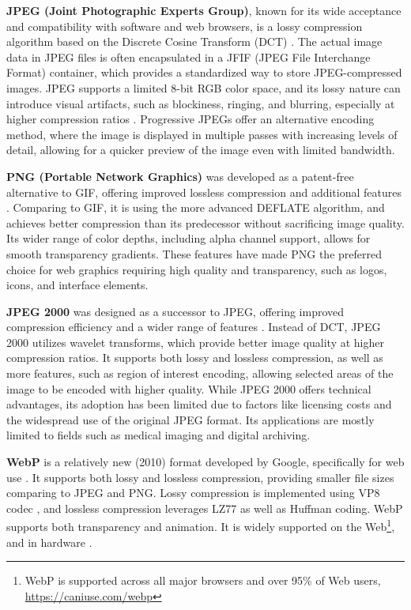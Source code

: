 \textbf{JPEG (Joint Photographic Experts Group)}, known for its wide acceptance and compatibility with software and web browsers, is a lossy compression algorithm based on the Discrete Cosine Transform (DCT) \cite{wallace1991jpeg}. The actual image data in JPEG files is often encapsulated in a JFIF (JPEG File Interchange Format) container, which provides a standardized way to store JPEG-compressed images.  JPEG supports a limited 8-bit RGB color space, and its lossy nature can introduce visual artifacts, such as blockiness, ringing, and blurring, especially at higher compression ratios \cite{meesters2002single-blockiness}. Progressive JPEGs offer an alternative encoding method, where the image is displayed in multiple passes with increasing levels of detail, allowing for a quicker preview of the image even with limited bandwidth.

\textbf{PNG (Portable Network Graphics)} was developed as a patent-free alternative to GIF, offering improved lossless compression and additional features \cite{roelofs1999png}. Comparing to GIF, it is using the more advanced DEFLATE algorithm, and achieves better compression than its predecessor without sacrificing image quality. Its wider range of color depths, including alpha channel support, allows for smooth transparency gradients. These features have made PNG the preferred choice for web graphics requiring high quality and transparency, such as logos, icons, and interface elements.

\textbf{JPEG 2000} was designed as a successor to JPEG, offering improved compression efficiency and a wider range of features \cite{skodras2001jpeg2000}. Instead of DCT, JPEG 2000 utilizes wavelet transforms, which provide better image quality at higher compression ratios. It supports both lossy and lossless compression, as well as more features, such as region of interest encoding, allowing selected areas of the image to be encoded with higher quality. While JPEG 2000 offers technical advantages, its adoption has been limited due to factors like licensing costs and the widespread use of the original JPEG format. Its applications are mostly limited to fields such as medical imaging and digital archiving.

\textbf{WebP} is a relatively new (2010) format developed by Google, specifically for web use \cite{zern2024rfc-webp}. It supports both lossy and lossless compression, providing smaller file sizes comparing to JPEG and PNG. Lossy compression is implemented using VP8 codec \cite{bankoski2011rfc, bankoski2011technical-vp8}, and lossless compression leverages LZ77 as well as Huffman coding. WebP supports both transparency and animation. It is widely supported on the Web\footnote{WebP is supported across all major browsers and over 95\% of Web users, \url{https://caniuse.com/webp}}, and in hardware \cite{bansal2012vp8-encoder}.

